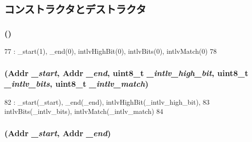 \subsection{コンストラクタとデストラクタ}
\hypertarget{classAddrRange_a44912ab62e2b99d5550e4580da4f0bb6}{
\subsubsection[{AddrRange}]{ ()}}
\label{classAddrRange_a44912ab62e2b99d5550e4580da4f0bb6}



\begin{DoxyCode}
77         : _start(1), _end(0), intlvHighBit(0), intlvBits(0), intlvMatch(0)
78     {}
\end{DoxyCode}
\hypertarget{classAddrRange_a76f19b26f65154f49d9316dbe37dbde6}{
\subsubsection[{AddrRange}]{ ({\bf Addr} {\em \_\-start}, \/  {\bf Addr} {\em \_\-end}, \/  uint8\_\-t {\em \_\-intlv\_\-high\_\-bit}, \/  uint8\_\-t {\em \_\-intlv\_\-bits}, \/  uint8\_\-t {\em \_\-intlv\_\-match})}}
\label{classAddrRange_a76f19b26f65154f49d9316dbe37dbde6}



\begin{DoxyCode}
82         : _start(_start), _end(_end), intlvHighBit(_intlv_high_bit),
83           intlvBits(_intlv_bits), intlvMatch(_intlv_match)
84     {}
\end{DoxyCode}
\hypertarget{classAddrRange_ae9e275cc2d13224e46507e52869d9fa0}{
\subsubsection[{AddrRange}]{ ({\bf Addr} {\em \_\-start}, \/  {\bf Addr} {\em \_\-end})}}
\label{classAddrRange_ae9e275cc2d13224e46507e52869d9fa0}



